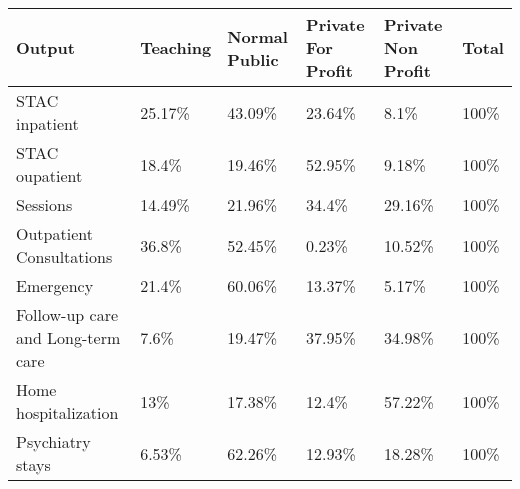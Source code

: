 \begin{tabular}{llllll}
  \toprule
Output & Teaching & Normal Public & Private For Profit & Private Non Profit & Total \\ 
  \midrule
STAC inpatient & 25.17\% & 43.09\% & 23.64\% & 8.1\% & 100\% \\ 
  STAC oupatient & 18.4\% & 19.46\% & 52.95\% & 9.18\% & 100\% \\ 
  Sessions & 14.49\% & 21.96\% & 34.4\% & 29.16\% & 100\% \\ 
  Outpatient Consultations & 36.8\% & 52.45\% & 0.23\% & 10.52\% & 100\% \\ 
  Emergency & 21.4\% & 60.06\% & 13.37\% & 5.17\% & 100\% \\ 
  Follow-up care and Long-term care & 7.6\% & 19.47\% & 37.95\% & 34.98\% & 100\% \\ 
  Home hospitalization & 13\% & 17.38\% & 12.4\% & 57.22\% & 100\% \\ 
  Psychiatry stays & 6.53\% & 62.26\% & 12.93\% & 18.28\% & 100\% \\ 
   \bottomrule
\end{tabular}
